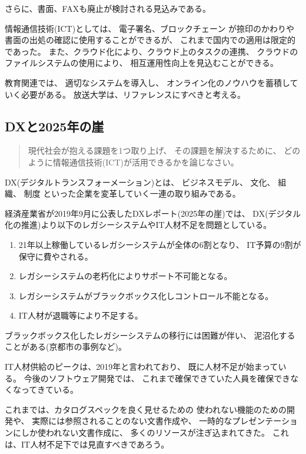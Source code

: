 \documentclass[12pt]{jsarticle}
\begin{document}
さらに、書面、FAXも廃止が検討される見込みである。

情報通信技術(ICT)としては、
電子署名、ブロックチェーン
が捺印のかわりや書面の出処の確認に使用することができるが、
これまで国内での適用は限定的であった。
また、クラウド化により、クラウド上のタスクの連携、
クラウドのファイルシステムの使用により、
相互運用性向上を見込むことができる。

教育関連では、
適切なシステムを導入し、
オンライン化のノウハウを蓄積していく必要がある。
放送大学は、リファレンスにすべきと考える。


\subsection{DXと2025年の崖}

\begin{quotation}
現代社会が抱える課題を1つ取り上げ、
その課題を解決するために、
どのように情報通信技術(ICT)が活用できるかを論じなさい。
\end{quotation}

DX(デジタルトランスフォーメーション)とは、
ビジネスモデル、
文化、
組織、
制度
といった企業を変革していく一連の取り組みである。

経済産業省が2019年9月に公表したDXレポート(2025年の崖)では、
DX(デジタル化の推進)より以下のレガシーシステムやIT人材不足を問題としている。

\begin{enumerate}
\item 21年以上稼働しているレガシーシステムが全体の6割となり、
      IT予算の9割が保守に費やされる。
\item レガシーシステムの老朽化によりサポート不可能となる。
\item レガシーシステムがブラックボックス化しコントロール不能となる。
\item IT人材が退職等により不足する。
\end{enumerate}

ブラックボックス化したレガシーシステムの移行には困難が伴い、
泥沼化することがある(京都市の事例など)。

IT人材供給のピークは、2019年と言われており、
既に人材不足が始まっている。
今後のソフトウェア開発では、
これまで確保できていた人員を確保できなくなってきている。

これまでは、カタログスペックを良く見せるための
使われない機能のための開発や、
実際には参照されることのない文書作成や、
一時的なプレゼンテーションにしか使われない文書作成に、
多くのリソースが注ぎ込まれてきた。
これは、IT人材不足下では見直すべきであろう。
\end{document}
